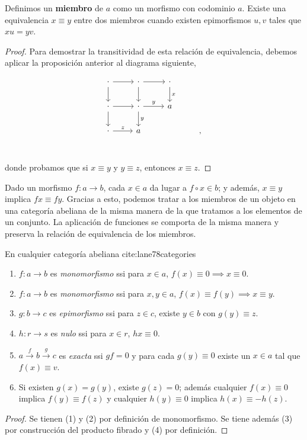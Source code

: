 \documentclass[11pt]{article}
\begin{document}
\begin{itemize}
\begin{itemize}
\begin{definition}
Definimos un \textbf{miembro} de $a$ como un morfismo con codominio $a$. Existe
una equivalencia $x \equiv y$ entre dos miembros cuando existen epimorfismos
$u,v$ tales que $xu=yv$.
\end{definition}
\begin{proof}
Para demostrar la transitividad de esta relación de equivalencia,
debemos aplicar la proposición anterior al diagrama siguiente,

\[\begin{tikzcd}
\cdot \rar\dar & 
\cdot \rar\dar& 
\cdot \dar{x}\\
\cdot \rar\dar& 
\cdot \rar{y}\dar{y}&
a \\
\cdot \rar{z} &
a &&,\\
\end{tikzcd}\]

donde probamos que si $x \equiv y$ y $y \equiv z$, entonces $x \equiv z$.
\end{proof}

Dado un morfismo $f \colon a \to b$, cada $x \in a$ da lugar a $f \circ x \in b$; y además,
$x \equiv y$ implica $f x \equiv f y$. Gracias a esto, podemos tratar a los miembros
de un objeto en una categoría abeliana de la misma manera de la que
tratamos a los elementos de un conjunto. La aplicación de funciones
se comporta de la misma manera y preserva la relación de equivalencia
de los miembros.

\begin{proposition}
En cualquier categoría abeliana cite:lane78categories

\begin{enumerate}
\item $f \colon a \to b$ es \emph{monomorfismo} ssi para $x \in a$, $f(x) \equiv 0 \implies x \equiv 0$.
\item $f \colon a \to b$ es \emph{monomorfismo} ssi para $x,y \in a$, $f(x) \equiv f(y) \implies x\equiv y$.
\item $g\colon b \to c$ es \emph{epimorfismo} ssi para $z\in c$, existe $y \in b$ con $g(y) \equiv z$.
\item $h\colon r \to s$ es \emph{nulo} ssi para $x \in r$, $hx \equiv 0$.
\item $a \overset{f}\to b\overset{g}\to c$ es \emph{exacta} ssi $gf = 0$ y para cada $g(y)\equiv 0$ existe un
$x \in a$ tal que $f(x) \equiv v$.
\item Si existen $g(x) = g(y)$, existe $g(z) = 0$; además cualquier $f(x) \equiv 0$
    implica $f(y) \equiv f(z)$ y cualquier $h(y)\equiv 0$ implica $h(x) \equiv -h(z)$.
\end{enumerate}
\end{proposition}
\begin{proof}
Se tienen (1) y (2) por definición de monomorfismo. Se tiene además
(3) por construcción del producto fibrado y (4) por definición.


\end{proof}
\end{itemize}
\end{itemize}
\end{document}
